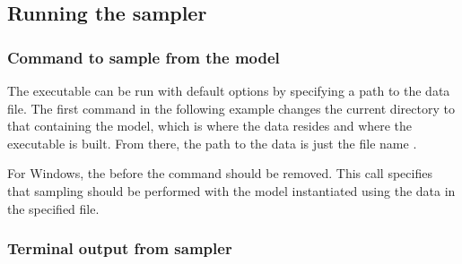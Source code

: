\documentclass[article]{jss}
\begin{document}
\subsection{Running the sampler}

\subsubsection{Command to sample from the model}

The executable can be run with default options by specifying a path to
the data file.  The first command in the following example changes the
current directory to that containing the model, which is where the
data resides and where the executable is built.  From there, the path
to the data is just the file name .
%
\begin{CodeChunk}
\end{CodeChunk}
%
For Windows, the  before the command should be removed.  This
call specifies that sampling should be performed with the model
instantiated using the data in the specified file.

\subsubsection{Terminal output from sampler}
\end{document}
